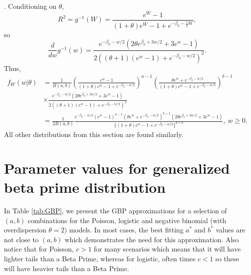 \documentclass[12pt]{article}
\begin{document}
. Conditioning on $\theta$,
$$    R^2
    =g^{-1}(W)
    =\frac{e^W-1}{(1+\theta)e^W-1 + e^{-\beta_0-\frac12W}},
$$so
$$    \frac{d}{dw}g^{-1}(w)
    =\frac{e^{-\beta_0 - w/2} (2 \theta e^{\beta_0 + 3 w/2} + 3 e^w - 1)}{2 ( (\theta + 1)(e^w - 1) + e^{-\beta_0-w/2})^2}.
$$Thus,
\begin{align}
    f_W(w|\theta)
    &=\frac1{B(a,b)}\left(\frac{e^w-1}{(1+\theta)e^w-1 + e^{-\beta_0-w/2}}\right)^{a-1}\left(\frac{\theta e^w + e^{-\beta_0-w/2}}{(1+\theta)e^w-1 + e^{-\beta_0-w/2}}\right)^{b-1}\nonumber\\
    &\times\frac{e^{-\beta_0 - w/2} (2 \theta e^{\beta_0 + 3 w/2} + 3 e^w - 1)}{2 ( (\theta + 1)(e^w - 1) + e^{-\beta_0-w/2})^2}\\
    &= \frac1{2B(a,b)} \frac{e^{-\beta_0 - w/2}(e^w-1)^{a-1}(\theta e^w+e^{-\beta_0-w/2})^{b-1} (2 \theta e^{\beta_0 + 3 w/2} + 3 e^w - 1)}{\{(1+\theta)e^w-1+e^{-\beta_0-w/2}\}^{a+b}},\ w\geq0.\nonumber
\end{align}
All other distributions from this section are found similarly.


\section{Parameter values for generalized beta prime distribution}

In Table \ref{tab:GBP}, we present the GBP approximations for a selection of $(a,b)$ combinations for the Poisson, logistic and negative binomial (with overdispersion $\theta=2)$ models. In most cases, the best fitting $a^*$ and $b^*$ values are not close to $(a,b)$ which demonstrates the need for this approximation. Also notice that for Poisson, $c>1$ for many scenarios which means that it will have lighter tails than a Beta Prime, whereas for logistic, often times $c<1$ so these will have heavier tails than a Beta Prime.
\end{document}
